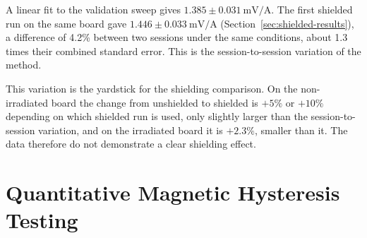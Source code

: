\documentclass[12pt,a4paper]{article}
\begin{document}
\begin{figure}[H]
\begin{minipage}[c]{0.58\textwidth}
        \label{fig:variance-overlay}
    \end{minipage}
    
\end{figure}

A linear fit to the validation sweep gives $1.385 \pm \SI{0.031}{\milli\volt\per\ampere}$. The first shielded run on the same board gave $1.446 \pm \SI{0.033}{\milli\volt\per\ampere}$ (Section~\ref{sec:shielded-results}), a difference of 4.2\% between two sessions under the same conditions, about 1.3 times their combined standard error. This is the session-to-session variation of the method.

This variation is the yardstick for the shielding comparison. On the non-irradiated board the change from unshielded to shielded is $+5\%$ or $+10\%$ depending on which shielded run is used, only slightly larger than the session-to-session variation, and on the irradiated board it is $+2.3\%$, smaller than it. The data therefore do not demonstrate a clear shielding effect.

\section{Quantitative Magnetic Hysteresis Testing}
\label{sec:hysteresis}
\end{document}
